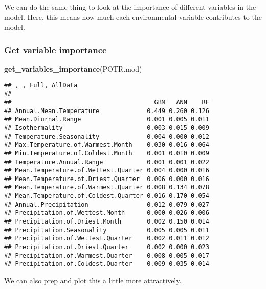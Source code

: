 \documentclass[]{article}
\newenvironment{Shaded}{\begin{snugshade}}{\end{snugshade}}
\newcommand{\KeywordTok}[1]{\textcolor[rgb]{0.13,0.29,0.53}{\textbf{#1}}}
\newcommand{\NormalTok}[1]{#1}
\begin{document}
We can do the same thing to look at the importance of different
variables in the model. Here, this means how much each environmental
variable contributes to the model.

\subsubsection{Get variable importance}\label{get-variable-importance}

\begin{Shaded}
\begin{Highlighting}[]
\KeywordTok{get_variables_importance}\NormalTok{(POTR.mod)}
\end{Highlighting}
\end{Shaded}

\begin{verbatim}
## , , Full, AllData
## 
##                                       GBM   ANN    RF
## Annual.Mean.Temperature             0.449 0.260 0.126
## Mean.Diurnal.Range                  0.001 0.005 0.011
## Isothermality                       0.003 0.015 0.009
## Temperature.Seasonality             0.004 0.000 0.012
## Max.Temperature.of.Warmest.Month    0.030 0.016 0.064
## Min.Temperature.of.Coldest.Month    0.001 0.010 0.009
## Temperature.Annual.Range            0.001 0.001 0.022
## Mean.Temperature.of.Wettest.Quarter 0.004 0.000 0.016
## Mean.Temperature.of.Driest.Quarter  0.006 0.000 0.016
## Mean.Temperature.of.Warmest.Quarter 0.008 0.134 0.078
## Mean.Temperature.of.Coldest.Quarter 0.016 0.170 0.054
## Annual.Precipitation                0.012 0.079 0.027
## Precipitation.of.Wettest.Month      0.000 0.026 0.006
## Precipitation.of.Driest.Month       0.002 0.150 0.014
## Precipitation.Seasonality           0.005 0.005 0.011
## Precipitation.of.Wettest.Quarter    0.002 0.011 0.012
## Precipitation.of.Driest.Quarter     0.002 0.000 0.023
## Precipitation.of.Warmest.Quarter    0.008 0.005 0.017
## Precipitation.of.Coldest.Quarter    0.009 0.035 0.014
\end{verbatim}

We can also prep and plot this a little more attractively.
\end{document}
